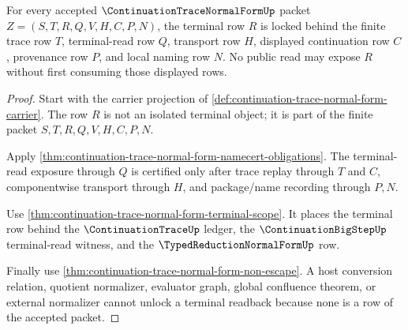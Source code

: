 \begin{theorem}
\label{thm:continuation-trace-normal-form-terminal-readback-lock}
For every accepted $\ContinuationTraceNormalFormUp$ packet $Z=(S,T,R,Q,V,H,C,P,N)$, the terminal row $R$ is locked behind the finite trace row $T$, terminal-read row $Q$, transport row $H$, displayed continuation row $C$, provenance row $P$, and local naming row $N$. No public read may expose $R$ without first consuming those displayed rows.
\end{theorem}
\begin{proof}
Start with the carrier projection of \autoref{def:continuation-trace-normal-form-carrier}. The row $R$ is not an isolated terminal object; it is part of the finite packet $S,T,R,Q,V,H,C,P,N$.

Apply \autoref{thm:continuation-trace-normal-form-namecert-obligations}. The terminal-read exposure through $Q$ is certified only after trace replay through $T$ and $C$, componentwise transport through $H$, and package/name recording through $P,N$.

Use \autoref{thm:continuation-trace-normal-form-terminal-scope}. It places the terminal row behind the $\ContinuationTraceUp$ ledger, the $\ContinuationBigStepUp$ terminal-read witness, and the $\TypedReductionNormalFormUp$ row.

Finally use \autoref{thm:continuation-trace-normal-form-non-escape}. A host conversion relation, quotient normalizer, evaluator graph, global confluence theorem, or external normalizer cannot unlock a terminal readback because none is a row of the accepted packet.
\end{proof}

